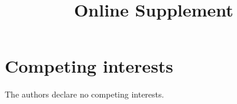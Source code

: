 \documentclass{article}
\newcommand{\beginsupplement}{
  \setcounter{table}{0}  
  \renewcommand{\thetable}{S\arabic{table}} 
  \setcounter{figure}{0} 
  \renewcommand{\thefigure}{S\arabic{figure}}
  \setcounter{section}{0} 
  \renewcommand{\thesection}{S\arabic{section}}
}
\begin{document}
\section*{Competing interests}

The authors declare no competing interests.

\clearpage
\beginsupplement
\title{\supptitlefont\noindent Online Supplement}
\maketitle


\end{document}
